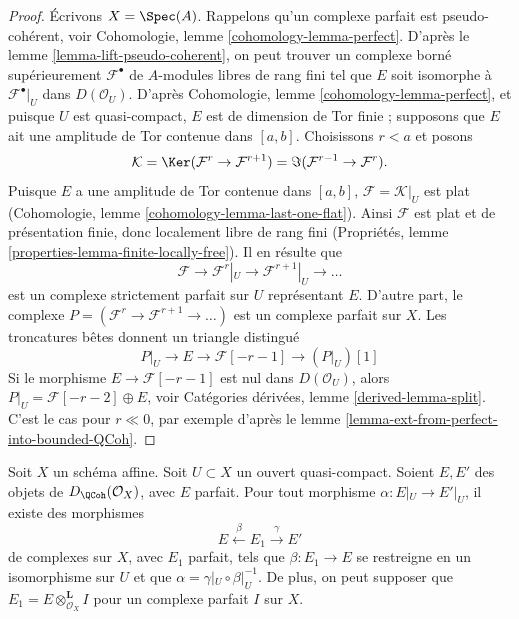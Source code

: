 \begin{proof}
Écrivons $X = \Spec(A)$. Rappelons qu'un complexe parfait est
pseudo-cohérent, voir
Cohomologie, lemme \ref{cohomology-lemma-perfect}.
D'après le lemme \ref{lemma-lift-pseudo-coherent}, on peut trouver un complexe borné supérieurement
$\mathcal{F}^\bullet$ de $A$-modules libres de rang fini tel que $E$ soit
isomorphe à $\mathcal{F}^\bullet|_U$ dans $D(\mathcal{O}_U)$.
D'après Cohomologie, lemme \ref{cohomology-lemma-perfect}, et puisque
$U$ est quasi-compact, $E$ est de dimension de Tor finie ; supposons que
$E$ ait une amplitude de Tor contenue dans $[a, b]$. Choisissons $r < a$ et posons
$$
\mathcal{K} = \Ker(\mathcal{F}^{r} \to \mathcal{F}^{r + 1})
= \Im(\mathcal{F}^{r - 1} \to \mathcal{F}^r).
$$
Puisque $E$ a une amplitude de Tor contenue dans $[a, b]$,
$\mathcal{F} = \mathcal{K}|_U$ est
plat (Cohomologie, lemme \ref{cohomology-lemma-last-one-flat}).
Ainsi $\mathcal{F}$ est plat et de présentation finie, donc localement
libre de rang fini (Propriétés, lemme \ref{properties-lemma-finite-locally-free}).
Il en résulte que
$$
\mathcal{F} \to \mathcal{F}^r|_U \to \mathcal{F}^{r + 1}|_U \to \ldots
$$
est un complexe strictement parfait sur $U$ représentant $E$. D'autre part,
le complexe $P = (\mathcal{F}^r \to \mathcal{F}^{r + 1} \to \ldots )$
est un complexe parfait sur $X$. Les
troncatures bêtes donnent un triangle distingué
$$
P|_U \to E \to \mathcal{F}[-r - 1] \to (P|_U)[1]
$$
Si le morphisme $E \to \mathcal{F}[-r - 1]$ est nul dans $D(\mathcal{O}_U)$,
alors $P|_U = \mathcal{F}[-r - 2] \oplus E$, voir
Catégories dérivées, lemme \ref{derived-lemma-split}.
C'est le cas pour $r \ll 0$, par exemple d'après le
lemme \ref{lemma-ext-from-perfect-into-bounded-QCoh}.
\end{proof}

\begin{lemma}
\label{lemma-lift-map}
Soit $X$ un schéma affine. Soit $U \subset X$ un ouvert quasi-compact.
Soient $E, E'$ des objets de $D_\QCoh(\mathcal{O}_X)$, avec $E$ parfait.
Pour tout morphisme $\alpha : E|_U \to E'|_U$, il existe des morphismes
$$
E \xleftarrow{\beta} E_1 \xrightarrow{\gamma} E'
$$
de complexes sur $X$, avec $E_1$ parfait, tels que $\beta : E_1 \to E$
se restreigne en un isomorphisme sur $U$ et que
$\alpha = \gamma|_U \circ \beta|_U^{-1}$.
De plus, on peut supposer que $E_1 = E \otimes_{\mathcal{O}_X}^\mathbf{L} I$
pour un complexe parfait $I$ sur $X$.
\end{lemma}

